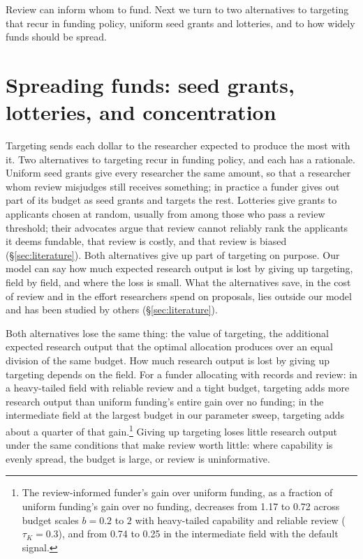 \documentclass[article, 11pt, reqno]{amsart}
\theoremstyle{named}
\begin{document}


Review can inform whom to fund. Next we turn to two alternatives to targeting that recur in funding policy, uniform seed grants and lotteries, and to how widely funds should be spread.

\section{Spreading funds: seed grants, lotteries, and concentration}\label{sec:egalitarian}

Targeting sends each dollar to the researcher expected to produce the most with it. Two alternatives to targeting recur in funding policy, and each has a rationale. Uniform seed grants give every researcher the same amount, so that a researcher whom review misjudges still receives something; in practice a funder gives out part of its budget as seed grants and targets the rest. Lotteries give grants to applicants chosen at random, usually from among those who pass a review threshold; their advocates argue that review cannot reliably rank the applicants it deems fundable, that review is costly, and that review is biased (\S\ref{sec:literature}). Both alternatives give up part of targeting on purpose. Our model can say how much expected research output is lost by giving up targeting, field by field, and where the loss is small. What the alternatives save, in the cost of review and in the effort researchers spend on proposals, lies outside our model and has been studied by others (\S\ref{sec:literature}).

Both alternatives lose the same thing: the value of targeting, the additional expected research output that the optimal allocation produces over an equal division of the same budget. How much research output is lost by giving up targeting depends on the field. For a funder allocating with records and review: in a heavy-tailed field with reliable review and a tight budget, targeting adds more research output than uniform funding's entire gain over no funding; in the intermediate field at the largest budget in our parameter sweep, targeting adds about a quarter of that gain.\footnote{The review-informed funder's gain over uniform funding, as a fraction of uniform funding's gain over no funding, decreases from 1.17 to 0.72 across budget scales $b = 0.2$ to $2$ with heavy-tailed capability and reliable review ($\tau_K = 0.3$), and from 0.74 to 0.25 in the intermediate field with the default signal.} Giving up targeting loses little research output under the same conditions that make review worth little: where capability is evenly spread, the budget is large, or review is uninformative.
\end{document}

